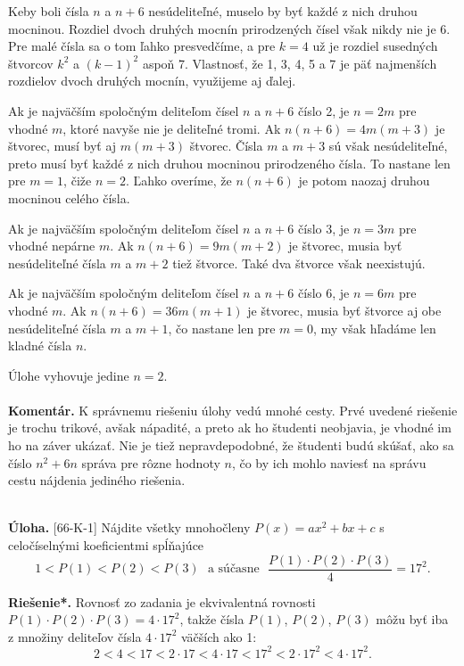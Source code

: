 \documentclass[11pt,a4paper,oneside,final]{book}
\newcommand{\kom}{\textbf{Komentár.} }
\newcommand{\ul}{\textbf{Úloha.} }
\newcommand{\rieh}{\textbf{Riešenie*.} }
\begin{document}
Keby boli čísla $n$ a $n+6$ nesúdeliteľné, muselo by byť každé z nich druhou mocninou. Rozdiel dvoch druhých mocnín prirodzených čísel však nikdy nie je 6. Pre malé čísla sa o tom ľahko presvedčíme, a pre $k = 4$ už je rozdiel susedných štvorcov $k^2$ a $(k - 1)^2$ aspoň 7. Vlastnosť, že 1, 3, 4, 5 a 7 je päť najmenších rozdielov dvoch druhých mocnín, využijeme aj ďalej.

Ak je najväčším spoločným deliteľom čísel $n$ a $n+6$ číslo 2, je $n = 2m$ pre vhodné $m$, ktoré navyše nie je deliteľné tromi. Ak $n(n + 6) = 4m(m + 3)$ je štvorec, musí byť aj $m(m + 3)$ štvorec. Čísla $m$ a $m + 3$ sú však nesúdeliteľné, preto musí byť každé z nich druhou mocninou prirodzeného čísla. To nastane len pre $m = 1$, čiže $n = 2$. Ľahko overíme, že $n(n + 6)$ je potom naozaj druhou mocninou celého čísla.

Ak je najväčším spoločným deliteľom čísel $n$ a $n + 6$ číslo 3, je $n = 3m$ pre vhodné nepárne $m$. Ak $n(n+6) = 9m(m+2)$ je štvorec, musia byť nesúdeliteľné čísla $m$ a $m+2$ tiež štvorce. Také dva štvorce však neexistujú.

Ak je najväčším spoločným deliteľom čísel $n$ a $n + 6$ číslo 6, je $n = 6m$ pre vhodné $m$. Ak $n(n + 6) = 36m(m + 1)$ je štvorec, musia byť štvorce aj obe nesúdeliteľné čísla $m$ a $m + 1$, čo nastane len pre $m = 0$, my však hľadáme len kladné čísla $n$.

Úlohe vyhovuje jedine $n = 2$.\\
\\
\kom K správnemu riešeniu úlohy vedú mnohé cesty. Prvé uvedené riešenie je trochu trikové, avšak nápadité, a preto ak ho študenti neobjavia, je vhodné im ho na záver ukázať. Nie je tiež nepravdepodobné, že študenti budú skúšať, ako sa číslo $n^2+6n$ správa pre rôzne hodnoty $n$, čo by ich mohlo naviesť na správu cestu nájdenia jediného riešenia.\\
\\
\begin{tcolorbox}[breakable,notitle,boxrule=0pt,colback=light-gray,colframe=light-gray]\ul [66-K-1] Nájdite všetky mnohočleny $P(x) = ax^2 +bx+c$ s celočíselnými koeficientmi spĺňajúce
$$1 < P(1) < P(2) < P(3) \ \ \ \text{a súčasne} \ \  \
\frac{P(1) \cdot P(2) \cdot P(3)}{4}= 17^2.$$

\end{tcolorbox}

\rieh Rovnosť zo zadania je ekvivalentná rovnosti $P(1)\cdot P(2)\cdot P(3) = 4\cdot17^2$, takže čísla $P(1)$, $P(2)$, $P(3)$ môžu byť iba z množiny deliteľov čísla $4 \cdot 17^2$ väčších ako 1:
$$2 < 4 < 17 < 2 \cdot 17 < 4 \cdot 17 < 17^2< 2 \cdot 17^2< 4 \cdot 17^2.$$
\end{document}
